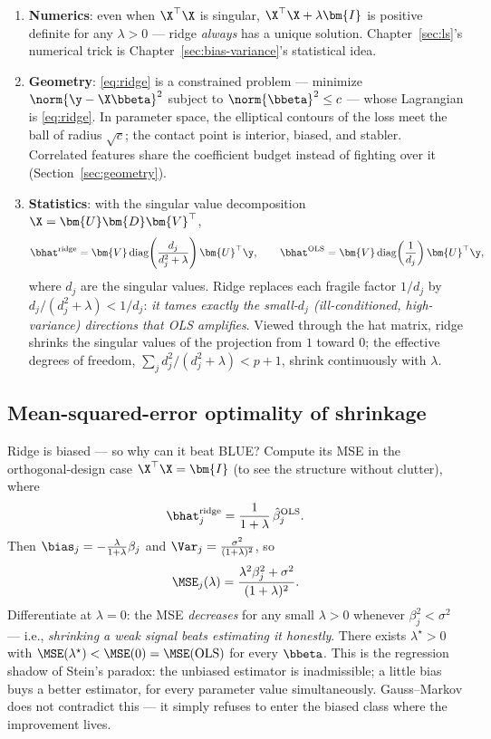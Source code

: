 \begin{enumerate}[label=(\arabic*)]
  \item \textbf{Numerics}: even when $\X^\top\X$ is singular, $\X^\top\X + \lambda\bm{I}$ is positive definite for any $\lambda > 0$ — ridge \emph{always} has a unique solution. Chapter~\ref{sec:ls}'s numerical trick is Chapter~\ref{sec:bias-variance}'s statistical idea.
  \item \textbf{Geometry}: \eqref{eq:ridge} is a constrained problem — minimize $\norm{\y-\X\bbeta}^2$ subject to $\norm{\bbeta}^2 \leq c$ — whose Lagrangian is \eqref{eq:ridge}. In parameter space, the elliptical contours of the loss meet the ball of radius $\sqrt{c}$; the contact point is interior, biased, and stabler. Correlated features share the coefficient budget instead of fighting over it (Section~\ref{sec:geometry}).
  \item \textbf{Statistics}: with the singular value decomposition $\X = \bm{U}\bm{D}\bm{V}^\top$,
  \[
    \bhat^{\mathrm{ridge}} = \bm{V} \, \mathrm{diag}\!\left(\frac{d_j}{d_j^2 + \lambda}\right) \bm{U}^\top \y,
    \qquad
    \bhat^{\mathrm{OLS}} = \bm{V} \, \mathrm{diag}\!\left(\frac{1}{d_j}\right) \bm{U}^\top \y,
  \]
  where $d_j$ are the singular values. Ridge replaces each fragile factor $1/d_j$ by $d_j/(d_j^2 + \lambda) < 1/d_j$: \emph{it tames exactly the small-$d_j$ (ill-conditioned, high-variance) directions that OLS amplifies}. Viewed through the hat matrix, ridge shrinks the singular values of the projection from $1$ toward $0$; the effective degrees of freedom, $\sum_j d_j^2/(d_j^2 + \lambda) < p+1$, shrink continuously with $\lambda$.
\end{enumerate}

\subsection{Mean-squared-error optimality of shrinkage}

Ridge is biased — so why can it beat BLUE? Compute its MSE in the orthogonal-design case $\X^\top\X = \bm{I}$ (to see the structure without clutter), where
\[
  \bhat^{\mathrm{ridge}}_j = \frac{1}{1+\lambda}\, \hat{\beta}_j^{\mathrm{OLS}}.
\]
Then $\bias_j = -\frac{\lambda}{1+\lambda}\beta_j$ and $\Var_j = \frac{\sigma^2}{(1+\lambda)^2}$, so
\[
  \MSE_j(\lambda) = \frac{\lambda^2 \beta_j^2 + \sigma^2}{(1+\lambda)^2}.
\]
Differentiate at $\lambda = 0$: the MSE \emph{decreases} for any small $\lambda > 0$ whenever $\beta_j^2 < \sigma^2$ — i.e., \emph{shrinking a weak signal beats estimating it honestly}. There exists $\lambda^\star > 0$ with $\MSE(\lambda^\star) < \MSE(0) = \MSE(\mathrm{OLS})$ for every $\bbeta$. This is the regression shadow of Stein's paradox: the unbiased estimator is inadmissible; a little bias buys a better estimator, for every parameter value simultaneously. Gauss--Markov does not contradict this — it simply refuses to enter the biased class where the improvement lives.


